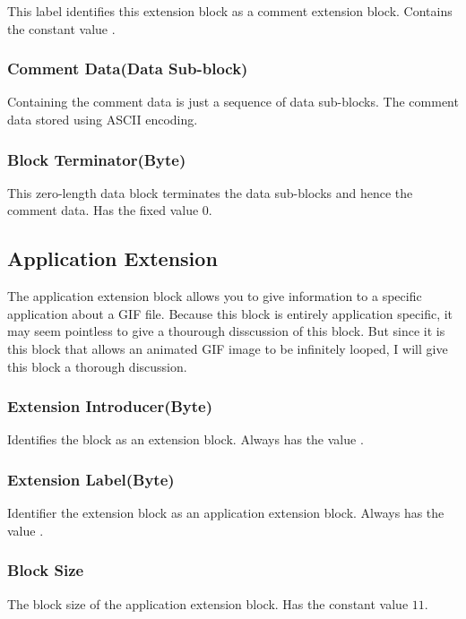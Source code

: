 This label identifies this extension block as a comment extension
block. Contains the constant value .

\subsubsection{Comment Data(Data Sub-block)}

Containing the comment data is just a sequence of data sub-blocks. The
comment data stored using ASCII encoding.

\subsubsection{Block Terminator(Byte)}

This zero-length data block terminates the data sub-blocks and hence
the comment data. Has the fixed value $0$.

\subsection{Application Extension}

The application extension block allows you to give information to a
specific application about a GIF file. Because this block is
entirely application specific, it may seem pointless to give a
thourough disscussion of this block. But since it is this block that
allows an animated GIF image to be infinitely looped, I will give this
block a thorough discussion.

\subsubsection{Extension Introducer(Byte)}

Identifies the block as an extension block. Always has the value
.

\subsubsection{Extension Label(Byte)}

Identifier the extension block as an application extension
block. Always has the value .

\subsubsection{Block Size}

The block size of the application extension block. Has the constant
value $11$.

